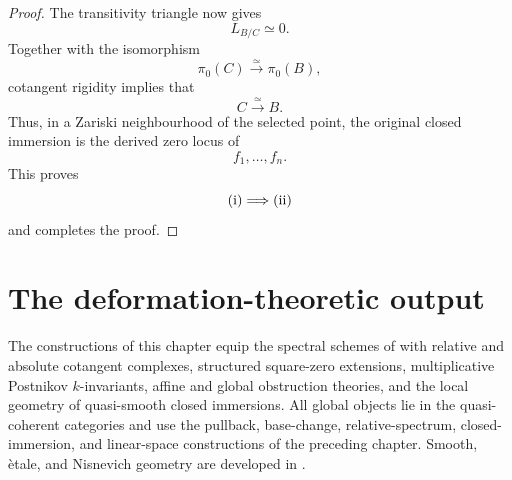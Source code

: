 \begin{proof}
The transitivity triangle now gives
\[
    L_{B/C}
    \simeq
    0.
\]
Together with the isomorphism
\[
    \pi_0(C)
    \xrightarrow{\simeq}
    \pi_0(B),
\]
cotangent rigidity
implies that
\[
    C
    \xrightarrow{\simeq}
    B.
\]
Thus, in a Zariski neighbourhood of the selected point, the original
closed immersion is the derived zero locus of
\[
    f_1,\ldots,f_n.
\]
This proves
\[
    \textup{(i)}
    \Longrightarrow
    \textup{(ii)}
\]
and completes the proof.
\end{proof}

\section{The deformation-theoretic output}
\label{sec:spectral-deformation-output}

The constructions of this chapter equip the spectral schemes of
 with relative and absolute
cotangent complexes, structured square-zero extensions, multiplicative
Postnikov $k$-invariants, affine and global obstruction theories, and the
local geometry of quasi-smooth closed immersions. All global objects lie
in the quasi-coherent categories and use the pullback, base-change,
relative-spectrum, closed-immersion, and linear-space constructions of
the preceding chapter. Smooth, \`etale, and Nisnevich geometry are
developed in .
